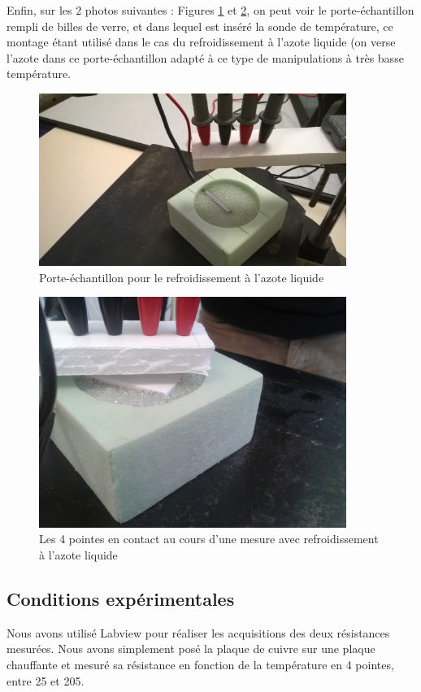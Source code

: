 \newpage

Enfin, sur les 2 photos suivantes : Figures \ref{photo4} et \ref{photo5}, on peut voir le porte-échantillon rempli de billes de verre, et dans lequel est inséré la sonde de température, ce montage étant utilisé dans le cas du refroidissement à l'azote liquide (on verse l'azote dans ce porte-échantillon adapté à ce type de manipulations à très basse température.

\begin{figure}[!b]
  \begin{center}
		\includegraphics[width=10cm]{./images/photo4.jpg}
		\caption{Porte-échantillon pour le refroidissement à l'azote liquide}
		\label{photo4}
	\end{center}
\end{figure}
\begin{figure}[!t]
  \begin{center}
		\includegraphics[width=10cm]{./images/photo5.jpg}
		\caption{Les 4 pointes en contact au cours d'une mesure avec refroidissement à l'azote liquide}
		\label{photo5}
	\end{center}
\end{figure}

\newpage

\subsection{Conditions expérimentales}
Nous avons utilisé Labview pour réaliser les acquisitions des deux résistances mesurées.
Nous avons simplement posé la plaque de cuivre sur une plaque chauffante et mesuré sa résistance en fonction de la température en 4 pointes, entre 25\celsius{} et 205\celsius{}.



